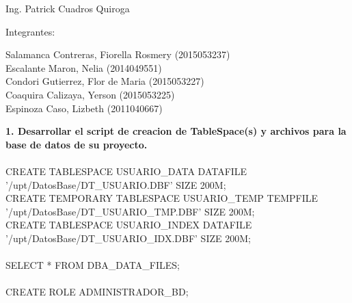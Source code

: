 \documentclass[12pt,letterpaper]{article}
\begin{document}
\begin{titlepage}
\begin{center}
\vspace*{0.1in}
\begin{large}
 Ing. Patrick Cuadros Quiroga\\
\end{large}

\vspace*{0.2in}
\vspace*{0.1in}
\begin{large}
Integrantes: \\
\vspace{\baselineskip}
\begin{flushleft}
Salamanca Contreras, Fiorella Rosmery		\hfill	(2015053237) \\
Escalante Maron, Nelia 		\hfill	(2014049551) \\
Condori Gutierrez, Flor de Maria            	\hfill	(2015053227) \\
Coaquira Calizaya, Yerson      	\hfill	(2015053225) \\
Espinoza Caso, Lizbeth  		\hfill	(2011040667) \\
\end{flushleft}
\end{large}
\end{center}

\end{titlepage}

\newpage

	

	\textbf{\Large 1. Desarrollar el script de creacion de TableSpace(s) y archivos para la base de datos de su proyecto.}
	\\\\
	CREATE TABLESPACE USUARIO\_DATA DATAFILE '/upt/DatosBase/DT\_USUARIO.DBF' SIZE 200M;\\
	CREATE TEMPORARY TABLESPACE USUARIO\_TEMP TEMPFILE\\ '/upt/DatosBase/DT\_USUARIO\_TMP.DBF' SIZE 200M;\\
	CREATE TABLESPACE USUARIO\_INDEX DATAFILE '/upt/DatosBase/DT\_USUARIO\_IDX.DBF' SIZE 200M;\\\\ 	
	SELECT * FROM DBA\_DATA\_FILES;\\\\	
	CREATE ROLE ADMINISTRADOR\_BD;\\\\
	
\end{document}

